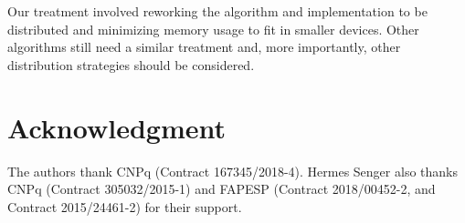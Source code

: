
Our treatment involved reworking the algorithm and implementation to be
distributed and %
minimizing memory usage to fit in smaller devices.
Other algorithms still need a similar treatment and, more importantly, other
distribution strategies should be considered.


\section*{Acknowledgment}

The authors thank CNPq (Contract 167345/2018-4).
Hermes Senger also thanks CNPq (Contract 305032/2015-1) and FAPESP (Contract
2018/00452-2, and Contract 2015/24461-2) for their support.
